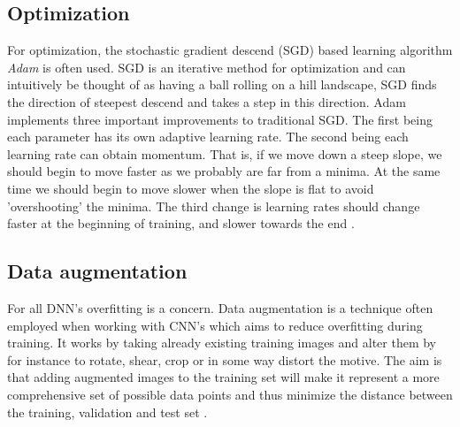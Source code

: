 \subsection{Optimization}
For optimization, the stochastic gradient descend (SGD) based learning algorithm \textit{Adam} is often used. SGD is an iterative method for optimization and can intuitively be thought of as having a ball rolling on a hill landscape, SGD finds the direction of steepest descend and takes a step in this direction. Adam implements three important improvements to traditional SGD. The first being each parameter has its own adaptive learning rate. The second being each learning rate can obtain momentum. That is, if we move down a steep slope, we should begin to move faster as we probably are far from a minima. At the same time we should begin to move slower when the slope is flat to avoid 'overshooting' the minima. The third change is learning rates should change faster at the beginning of training, and slower towards the end \cite{adam}.

\subsection{Data augmentation}
For all DNN's overfitting is a concern. Data augmentation is a technique often employed when working with CNN's which aims to reduce overfitting during training. It works by taking already existing training images and alter them by for instance to rotate, shear, crop or in some way distort the motive. The aim is that adding augmented images to the training set will make it represent a more comprehensive set of possible data points and thus minimize the distance between the training, validation and test set \cite{augmentation}.

